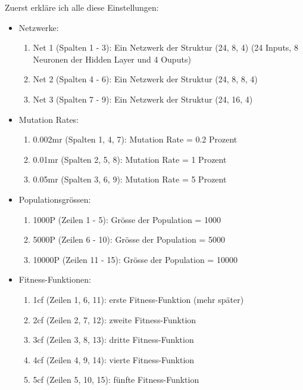 \documentclass[10pt,a4paper,ngerman,english]{article}
\begin{document}
Zuerst erkläre ich alle diese Einstellungen:
\begin{itemize}  
    \item Netzwerke: 
    \begin{enumerate}
        \item Net 1 (Spalten 1 - 3): Ein Netzwerk der Struktur (24, 8, 4) (24 Inputs, 8 Neuronen der Hidden Layer und 4 Ouputs)
        \item Net 2 (Spalten 4 - 6): Ein Netzwerk der Struktur (24, 8, 8, 4)
        \item Net 3 (Spalten 7 - 9): Ein Netzwerk der Struktur (24, 16, 4)
        
    \end{enumerate}
    \item Mutation Rates:
    \begin{enumerate}
        \item 0.002mr (Spalten 1, 4, 7): Mutation Rate = 0.2 Prozent
        \item 0.01mr (Spalten 2, 5, 8): Mutation Rate = 1 Prozent
        \item 0.05mr (Spalten 3, 6, 9): Mutation Rate = 5 Prozent 
    \end{enumerate}
    \item Populationsgrössen:
    \begin{enumerate}
        \item 1000P (Zeilen 1 - 5): Grösse der Population = 1000
        \item 5000P (Zeilen 6 - 10): Grösse der Population = 5000
        \item 10000P (Zeilen 11 - 15): Grösse der Population = 10000
    \end{enumerate}
    \item Fitness-Funktionen:
    \begin{enumerate}       
        \item 1cf (Zeilen 1, 6, 11): erste Fitness-Funktion (mehr später)
        \item 2cf (Zeilen 2, 7, 12): zweite Fitness-Funktion 
        \item 3cf (Zeilen 3, 8, 13): dritte Fitness-Funktion
        \item 4cf (Zeilen 4, 9, 14): vierte Fitness-Funktion
        \item 5cf (Zeilen 5, 10, 15): fünfte Fitness-Funktion
    \end{enumerate}
\end{itemize}
\end{document}
